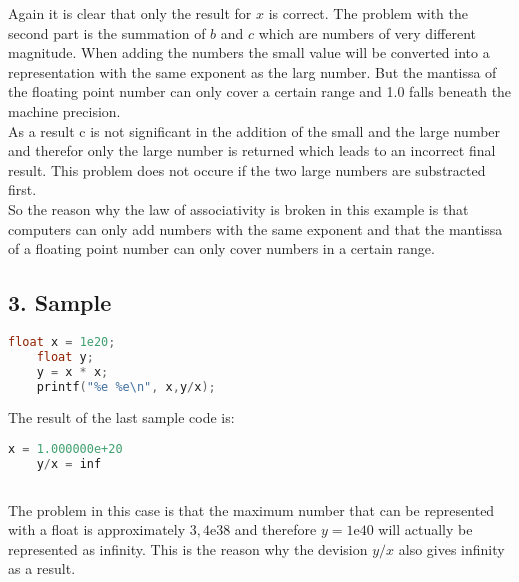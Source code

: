 Again it is clear that only the result for $x$ is correct.
The problem with the second part is the summation of $b$
and $c$ which are numbers of very different magnitude.
When adding the numbers the small value will be converted
into a representation with the same exponent as the 
larg number. But the mantissa of the floating point number
can only cover a certain range and 1.0 falls beneath the 
machine precision. \\
As a result c is not significant in the addition of the small
and the large number and therefor only the large number is returned 
which leads to an incorrect final result.
This problem does not occure if the two large numbers are 
substracted first.\\
So the reason why the law of associativity is broken in this
example is that computers can only add numbers with the same
exponent and that the mantissa of a floating point number
can only cover numbers in a certain range.\\


\subsection*{3. Sample}

\begin{lstlisting}[language=C++]
    float x = 1e20;
    float y;
    y = x * x;
    printf("%e %e\n", x,y/x);

\end{lstlisting}

The result of the last sample code is:
\begin{lstlisting}[language=C++]
    x = 1.000000e+20 
    y/x = inf
    
\end{lstlisting}

The problem in this case is that the maximum number that
can be represented with a float is approximately $3,4\textrm{e}38$
and therefore $y=1\textrm{e}40$ will actually be represented as infinity.
This is the reason why the devision $y/x$ also gives infinity as a result.\\